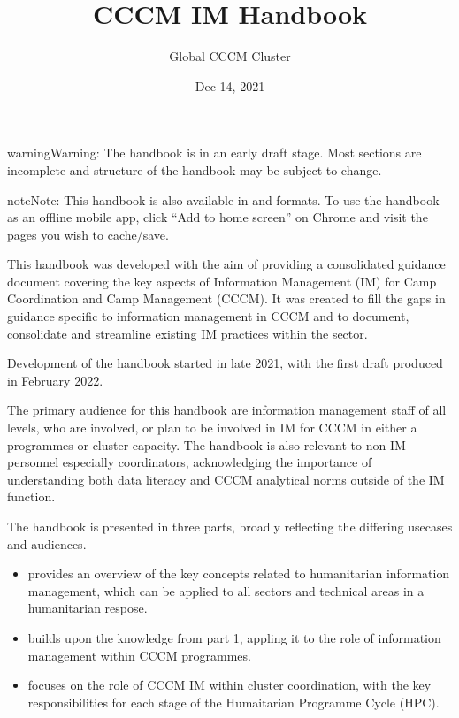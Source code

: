 \documentclass[letterpaper,10pt,english]{jupyterBook}
\title{CCCM IM Handbook}
\date{Dec 14, 2021}
\author{Global CCCM Cluster}
\begin{document}
\pagestyle{empty}
\sphinxmaketitle
\pagestyle{plain}
\sphinxtableofcontents
\pagestyle{normal}
\label{\detokenize{intro::doc}}


\begin{sphinxadmonition}{warning}{Warning:}
\sphinxAtStartPar
The handbook is in an early draft stage. Most sections are incomplete and structure of the handbook may be subject to change.
\end{sphinxadmonition}

\begin{sphinxadmonition}{note}{Note:}
\sphinxAtStartPar
This handbook is also available in  and  formats. To use the handbook as an offline mobile app, click “Add to home screen” on Chrome and visit the pages you wish to cache/save.
\end{sphinxadmonition}

\sphinxAtStartPar
This handbook was developed with the aim of providing a consolidated guidance document covering the key aspects of Information Management (IM) for Camp Coordination and Camp Management (CCCM). It was created to fill the gaps in guidance specific to information management in CCCM and to document, consolidate and streamline existing IM practices within the sector.%
\begin{footnote}[1]\sphinxAtStartFootnote
Development of the handbook started in late 2021, with the first draft produced in February 2022.
%
\end{footnote}

\sphinxAtStartPar
The primary audience for this handbook are information management staff of all levels, who are involved, or plan to be involved in IM for CCCM in either a programmes or cluster capacity. The handbook is also relevant to non IM personnel especially coordinators, acknowledging the importance of understanding both data literacy and CCCM analytical norms outside of the IM function.

\sphinxAtStartPar
The handbook is presented in three parts, broadly reflecting the differing use\sphinxhyphen{}cases and audiences.
\begin{itemize}
\item {} 
\sphinxAtStartPar
{} provides an overview of the key concepts related to humanitarian information management, which can be applied to all sectors and technical areas in a humanitarian respose.

\item {} 
\sphinxAtStartPar
{} builds upon the knowledge from part 1, appling it to the role of information management within CCCM programmes.

\item {} 
\sphinxAtStartPar
{} focuses on the role of CCCM IM within cluster coordination, with the key responsibilities for each stage of the Humaitarian Programme Cycle (HPC).

\end{itemize}
\end{document}

